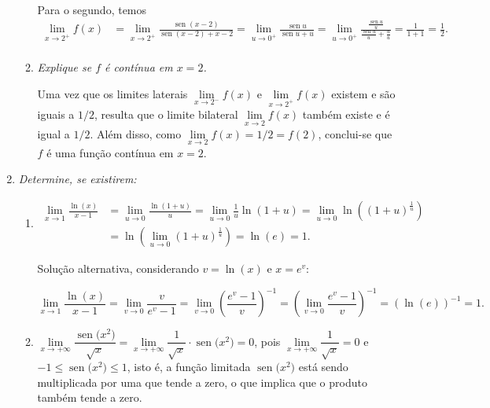 \documentclass[12pt,a4paper]{article}
\newcommand*\sen[1]{\operatorname{sen}{#1}}
\begin{document}
\begin{enumerate}
\begin{enumerate}
Para o segundo, temos
\begin{align*}
\lim\limits_{x\to 2^+} f(x)
& = \lim\limits_{x\to 2^+} \frac{\sen{(x-2)}}{\sen{(x-2)} + x-2}
  = \lim\limits_{u\to 0^+} \frac{\sen{u}}{\sen{u} + u}
  = \lim\limits_{u\to 0^+} \frac{\frac{\sen{u}}{u}}{\frac{\sen{u}}{u} + \frac{u}{u}}
  = \frac{1}{1 + 1}
  = \frac{1}{2}. \\
\end{align*}

\item \textit{Explique se $f$ é contínua em $x = 2$.}

Uma vez que os limites laterais $\lim\limits_{x\to 2^-} f(x)$ e $\lim\limits_{x\to 2^+} f(x)$ existem e são iguais a $1/2$, resulta que o limite bilateral $\lim\limits_{x\to 2} f(x)$ também existe e é igual a $1/2$. Além disso, como $\lim\limits_{x\to 2} f(x) = 1/2 = f(2)$, conclui-se que $f$ é uma função contínua em $x=2$.

\end{enumerate}

\item \textit{Determine, se existirem:}
\begin{enumerate}
\item
\begin{align*}
\lim\limits_{x\to 1} \frac{\ln(x)}{x-1}
& = \lim\limits_{u\to 0} \frac{\ln(1+u)}{u}
  = \lim\limits_{u\to 0} \frac{1}{u} \ln(1+u)
  = \lim\limits_{u\to 0} \ln\left((1+u)^\frac{1}{u}\right)\\
& = \ln \left( \lim\limits_{u\to 0} (1+u)^\frac{1}{u}\right)
  = \ln(e)
  = 1.
\end{align*}

Solução alternativa, considerando $v = \ln(x)$ e $x=e^v$:

\[
\lim\limits_{x\to 1} \frac{\ln(x)}{x-1}
  = \lim\limits_{v\to 0} \frac{v}{e^v-1}
  = \lim\limits_{v\to 0} \left( \frac{e^v-1}{v} \right)^{-1}
  = \left( \lim\limits_{v\to 0} \frac{e^v-1}{v} \right)^{-1}
  = (\ln(e))^{-1}
  = 1.
\]


\item $\lim\limits_{x\to +\infty} \dfrac{\sen(x^2)}{\sqrt{x}} = \lim\limits_{x\to +\infty} \dfrac{1}{\sqrt{x}} \cdot \sen(x^2) = 0$, pois $\lim\limits_{x\to +\infty} \dfrac{1}{\sqrt{x}} = 0$ e $-1 \leq \sen(x^2) \leq 1$, isto é, a função limitada $\sen(x^2)$ está sendo multiplicada por uma que tende a zero, o que implica que o produto também tende a zero.

\end{enumerate}


\end{enumerate}
\end{document}
